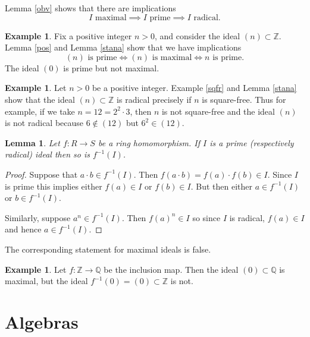\documentclass [12pt,oneside,a4paper,mathscr]{amsart}
\newtheorem{lemma}[thm]{Lemma}
\theoremstyle{definition}
\newtheorem{example}[thm]{Example}
\newcommand{\Q}{\mathbb{Q}}
\newcommand{\Z}{\mathbb Z}
\begin{document}
Lemma \ref{obv} shows that there are implications
\[I \text{ maximal} \implies I \text{ prime} \implies I \text{ radical}.\]

\begin{example}
Fix a positive integer $n>0$, and consider the ideal $(n)\subset \Z$. Lemma \ref{pos} and Lemma \ref{stana} show that we have implications
\[ (n)\text{ is prime} \iff (n) \text{ is maximal} \iff n \text{ is prime}.\]
The ideal $(0)$ is prime but not maximal.
\end{example}

\begin{example}
Let $n>0$ be a positive integer. Example \ref{sqfr} and Lemma \ref{stana} show that the ideal $(n)\subset \Z$ is radical precisely if $n$ is square-free. Thus for example, if we take $n=12=2^2\cdot 3$, then $n$ is not square-free and the ideal $(n)$ is not radical because $6\notin (12)$ but $6^2\in (12)$.
\end{example}

\begin{lemma}
Let $f\colon R \to S$ be a ring homomorphism. If $I$ is a prime (respectively radical) ideal then so is $f^{-1}(I)$.
\end{lemma}

\begin{proof}
Suppose that $a\cdot b\in f^{-1}(I)$. Then $f(a\cdot b)=f(a)\cdot f(b)\in I$. Since $I$ is prime this implies either $f(a)\in I$ or $f(b)\in I$. But then either $a\in f^{-1}(I)$ or $b\in f^{-1}(I)$.

Similarly, suppose $a^n\in f^{-1}(I)$. Then $f(a)^n \in I$ so since $I$ is radical, $f(a)\in I$ and hence $a\in f^{-1}(I)$.
\end{proof}

The corresponding statement for maximal ideals is false.

\begin{example}
Let $f\colon \Z \to \Q$ be the inclusion map. Then the ideal $(0)\subset \Q$ is maximal, but the ideal $f^{-1}(0)=(0)\subset \Z$ is not.
\end{example}








\section{Algebras}
\end{document}
